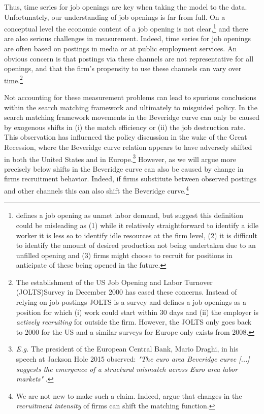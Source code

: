 \documentclass[11pt,article]{memoir}
\begin{document}
Thus, time series for job openings are key when taking the model to the data. Unfortunately, our understanding of job openings is far from full. On a conceptual level the economic content of a job opening is not clear,\footnote{\citet{Abraham1983} defines a job opening as unmet labor demand, but \cite{Elsby2014} suggest this definition could be misleading as (1) while it relatively straightforward to  identify a idle worker it is less so to identify idle resources at the firm level, (2) it is difficult to identify the amount of desired production not being undertaken due to an unfilled opening and (3) firms might choose to recruit for positions in anticipate of these being opened in the future.} and there are also serious challenges in measurement. Indeed, time series for job openings are often based on postings in media or at public employment services. An obvious concern is that postings via these channels are not representative for all openings, and that the firm's propensity to use these channels can vary over time.\footnote{The establishment of the US Job Opening and Labor Turnover (JOLTS)Survey in December 2000 has eased these concerns. Instead of relying on job-postings JOLTS is a survey and defines a job openings as a position for which (i) work could start within $30$ days and (ii) the employer is \emph{actively recruiting} for outside the firm. However, the JOLTS only goes back to 2000 for the US and a similar surveys for Europe only exists from 2008.}

Not accounting for these measurement problems can lead to spurious conclusions within the search matching framework and ultimately to misguided policy. In the search matching framework movements in the Beveridge curve can only be caused by exogenous shifts in (i) the match efficiency or (ii) the job destruction rate. This observation has influenced the policy discussion in the wake of the Great Recession, where the Beveridge curve relation appears to have adversely shifted in both the United States and in Europe.\footnote{\emph{E.g.} The president of the European Central Bank, Mario Draghi, in his speech at Jackson Hole 2015 observed: \emph{"The euro area Beveridge curve [...] suggests the emergence of a structural mismatch across Euro area labor markets"} \citep{Draghi2014}. } However, as we will argue more precisely below shifts in the Beveridge curve can also be caused by change in firms recruitment behavior. Indeed, if firms substitute between observed postings and other channels this can also shift the Beveridge curve.\footnote{We are not new to make such a claim. Indeed, \cite{Davis2013} argue that changes in the \emph{recruitment intensity} of firms can shift the matching function.}
\end{document}
